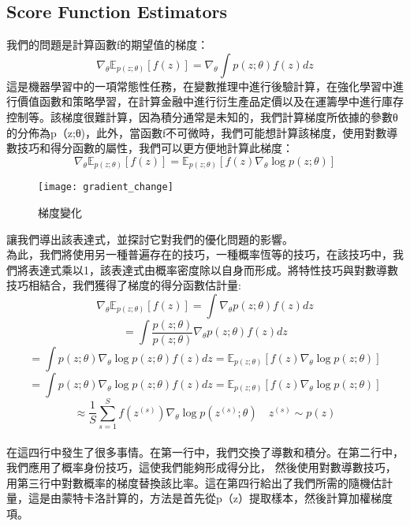 \subsection{Score Function Estimators}
我們的問題是計算函數f的期望值的梯度：\\
$$\nabla_\theta \mathbb{E}_{p(z;\theta)}[f(z)] =\nabla_\theta \int p(z; \theta)f(z) dz$$
 這是機器學習中的一項常態性任務，在變數推理中進行後驗計算，在強化學習中進行價值函數和策略學習，在計算金融中進行衍生產品定價以及在運籌學中進行庫存控制等。該梯度很難計算，因為積分通常是未知的，我們計算梯度所依據的參數θ的分佈為p（z;θ)，此外，當函數f不可微時，我們可能想計算該梯度，使用對數導數技巧和得分函數的屬性，我們可以更方便地計算此梯度：\\
$$\nabla_\theta \mathbb{E}_{p(z;\theta)}[f(z)] = \mathbb{E}_{p(z;\theta)}[f(z)\nabla_\theta \log p(z;\theta)]$$
\begin{figure}[hbt!]
\begin{center}
\texttt{[image: gradient\_change]}
\caption{梯度變化}
\end{center}
\end{figure}
 讓我們導出該表達式，並探討它對我們的優化問題的影響。\\
 為此，我們將使用另一種普遍存在的技巧，一種概率恆等的技巧，在該技巧中，我們將表達式乘以1，該表達式由概率密度除以自身而形成。將特性技巧與對數導數技巧相結合，我們獲得了梯度的得分函數估計量:\\
$$\nabla_\theta \mathbb{E}_{p(z;\theta)}[f(z)]=\int\nabla_\theta p(z;\theta)f(z) dz$$
$$= \int \frac{p(z;\theta)}{p(z;\theta)}\nabla_\theta p(z;\theta)f(z) dz$$
$$=\int p(z;\theta)\nabla_\theta \log p(z;\theta)f(z) dz = \mathbb{E}_{p(z;\theta)}[f(z)\nabla_\theta \log p(z;\theta)]$$
$$=\int p(z;\theta)\nabla_\theta \log p(z;\theta)f(z) dz = \mathbb{E}_{p(z;\theta)}[f(z)\nabla_\theta \log p(z;\theta)]$$
$$\approx \frac{1}{S} \sum_{s=1}^{S}f(z^{(s)})\nabla_\theta \log p(z^{(s)};\theta) \quad z^{(s)}\sim p(z)$$\\
在這四行中發生了很多事情。在第一行中，我們交換了導數和積分。在第二行中，我們應用了概率身份技巧，這使我們能夠形成得分比， 然後使用對數導數技巧，用第三行中對數概率的梯度替換該比率。這在第四行給出了我們所需的隨機估計量，這是由蒙特卡洛計算的，方法是首先從p（z）提取樣本，然後計算加權梯度項。\\

